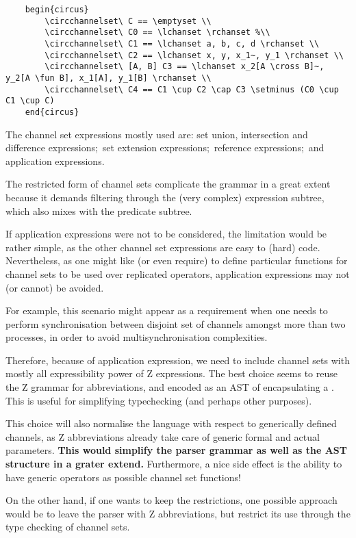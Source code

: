 \documentclass{article}
\begin{document}
\begin{verbatim}
    begin{circus}
        \circchannelset\ C == \emptyset \\
        \circchannelset\ C0 == \lchanset \rchanset %\\
        \circchannelset\ C1 == \lchanset a, b, c, d \rchanset \\
        \circchannelset\ C2 == \lchanset x, y, x_1~, y_1 \rchanset \\
        \circchannelset\ [A, B] C3 == \lchanset x_2[A \cross B]~, y_2[A \fun B], x_1[A], y_1[B] \rchanset \\
        \circchannelset\ C4 == C1 \cup C2 \cap C3 \setminus (C0 \cup C1 \cup C)
    end{circus}
\end{verbatim}
%
The channel set expressions mostly used are: set union, intersection and
difference expressions;~set extension expressions;~reference expressions;~and
application expressions.

%
\begin{issue}
  The restricted form of channel sets complicate the grammar in a great
  extent because it demands filtering through the (very complex) expression
  subtree, which also mixes with the predicate subtree.

  If application expressions were not to be considered, the limitation would be
  rather simple, as the other channel set expressions are easy to (hard) code. Nevertheless,
  as one might like (or even require) to define particular functions for
  channel sets to be used over replicated operators, application expressions may not (or cannot) be
  avoided.

  For example, this scenario might appear as a requirement when one needs to perform
  synchronisation between disjoint set of channels amongst more than two processes,
  in order to avoid multisynchronisation complexities.

  Therefore, because of application expression, we need to include channel sets with mostly
  all expressibility power of Z expressions. The best choice seems to reuse the
  Z grammar for abbreviations, and encoded as an AST of 
  encapsulating a . This is useful for simplifying typechecking
  (and perhaps other purposes).

  This choice will also normalise the language with respect to generically
  defined channels, as Z abbreviations already take care of generic formal and
  actual parameters. \textbf{This would simplify the parser grammar as well as the AST structure in a grater
  extend.} Furthermore, a nice side effect is the ability to have generic
  operators as possible channel set functions!

  On the other hand, if one wants to keep the restrictions, one possible
  approach would be to leave the parser with Z abbreviations, but restrict
  its use through the type checking of channel sets.
\end{issue}
\end{document}
